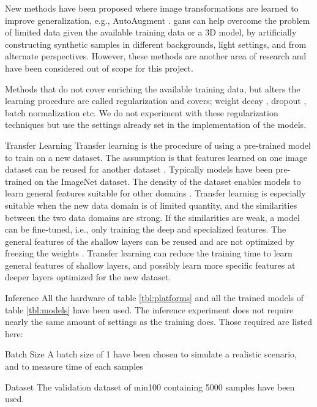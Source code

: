 \begin{enumdescript}
\begin{enumdescript}
		New methods have been proposed where image transformations are learned to improve generalization, e.g., AutoAugment \cite{cubuk_autoaugment:_2018}. \gls{gan}s can help overcome the problem of limited data given the available training data or a 3D model, by artificially constructing synthetic samples in different backgrounds, light settings, and from alternate perspectives. However, these methods are another area of research and have been considered out of scope for this project.
		
		Methods that do not cover enriching the available training data, but alters the learning procedure are called regularization and covers; weight decay \cite{krogh_simple_nodate}, dropout \cite{srivastava_dropout:_nodate}, batch normalization \cite{ioffe_batch_2015} etc. We do not experiment with these regularization techniques but use the settings already set in the implementation of the models.
		
		\item[Transfer Learning] Transfer learning is the procedure of using a pre-trained model to train on a new dataset. The assumption is that features learned on one image dataset can be reused for another dataset \cite{yosinski_how_2014}. Typically models have been pre-trained on the ImageNet dataset. The density of the dataset enables models to learn general features suitable for other domains \cite{kornblith_better_2019}. Transfer learning is especially suitable when the new data domain is of limited quantity, and the similarities between the two data domains are strong. If the similarities are weak, a model can be fine-tuned, i.e., only training the deep and specialized features. The general features of the shallow layers can be reused and are not optimized by freezing the weights \cite{li_cs231n:_2018}. Transfer learning can reduce the training time to learn general features of shallow layers, and possibly learn more specific features at deeper layers optimized for the new dataset.
	\end{enumdescript}
	
	\item[Inference]  All the hardware of table \ref{tbl:platforms} and all the trained models of table \ref{tbl:models} have been used. The inference experiment does not require nearly the same amount of settings as the training does. Those required are listed here:
	\begin{enumdescript}
		\item[Batch Size] A batch size of 1 have been chosen to simulate a realistic scenario, and to measure time of each samples
		\item[Dataset] The validation dataset of \gls{min100} containing 5000 samples have been used.
	\end{enumdescript} 
	
\end{enumdescript}

